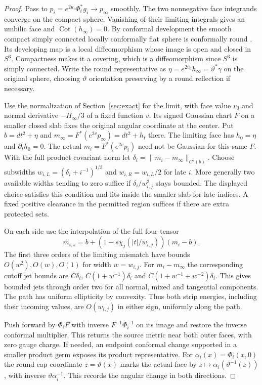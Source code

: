 \documentclass[11pt,letterpaper]{article}
\numberwithin{equation}{section}
\DeclareMathOperator{\Cot}{Cot}
\newcommand{\rd}{\gamma}
\begin{document}
\begin{proof}
Pass to \(p_i=e^{2u_i}\Phi_i^*g_i\to p_\infty\) smoothly.
The two nonnegative face integrands converge on the compact
sphere. Vanishing of their limiting integrals gives an umbilic
face and \(\Cot(h_\infty)=0\). By conformal development the
smooth compact simply connected locally conformally flat
sphere is conformally round \cite{Kuiper1949}. Its developing
map is a local diffeomorphism whose image is open and closed
in \(S^3\). Compactness makes it a covering, which is a
diffeomorphism since \(S^3\) is simply connected. Write the
round representative as \(\eta=e^{2v_0}h_\infty=\vartheta^*\rd\)
on the original sphere, choosing \(\vartheta\) orientation
preserving by a round reflection if necessary.

Use the normalization of Section~\ref{sec:exact} for the limit, with face
value \(v_0\) and normal derivative \(-H_\infty/3\) of a
fixed function \(v\). Its signed Gaussian chart \(F\) on a
smaller closed slab fixes the original angular coordinate at
the center. Put \(b=dt^2+\eta\) and
\(m_\infty=F^*(e^{2v}p_\infty)=dt^2+h_t\) there. The limiting
face has \(h_0=\eta\) and \(\partial_t h_0=0\). The actual
\(m_i=F^*(e^{2v}p_i)\) need not be Gaussian for this same
\(F\). With the full product covariant norm let
\(\delta_i=\|m_i-m_\infty\|_{C^2(b)}\). Choose subwidths
\(w_{i,L}=(\delta_i+i^{-1})^{1/3}\) and \(w_{i,R}=w_{i,L}/2\)
for late \(i\). More generally two available widths tending
to zero suffice if \(\delta_i/w_{i,j}^2\) stays bounded.
The displayed choice satisfies this condition and fits inside
the smaller slab for late indices. A fixed positive clearance
in the permitted region suffices if there are extra protected sets.

On each side use the interpolation of the full four-tensor
\[
 m_{i,s}=b+(1-s\chi_j(|t|/w_{i,j}))(m_i-b).
\]
The first three orders of the limiting mismatch have
bounds \(O(w^2),O(w),O(1)\) for width \(w=w_{i,j}\).
For \(m_i-m_\infty\) the corresponding cutoff jet bounds
are \(C\delta_i\), \(C(1+w^{-1})\delta_i\) and
\(C(1+w^{-1}+w^{-2})\delta_i\). This gives bounded jets
through order two for all normal, mixed and tangential
components. The path has uniform ellipticity by convexity.
Thus both strip energies, including their incoming values,
are \(O(w_{i,j})\) in either sign, uniformly along the path.

Push forward by \(\Phi_i F\) with inverse \(F^{-1}\Phi_i^{-1}\)
on its image and restore the inverse conformal multiplier.
This returns the source metric near both outer faces, with zero
gauge charge. If needed, an endpoint conformal change supported
in a smaller product germ exposes its product representative.
For \(\alpha_i(x)=\Phi_i(x,0)\) the round cap coordinate
\(z=\vartheta(x)\) marks the actual face by
\(z\mapsto\alpha_i(\vartheta^{-1}(z))\), with inverse
\(\vartheta\alpha_i^{-1}\). This records the angular change in
both directions.
\end{proof}
\end{document}
